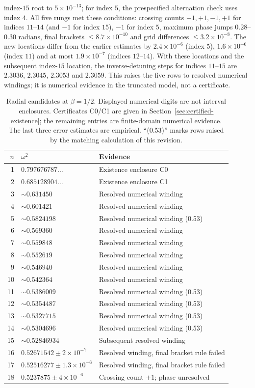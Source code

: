 index-$15$ root to $5\times10^{-13}$; for index $5$, the prespecified
alternation check uses index $4$. All five rungs met these conditions:
crossing counts $-1,+1,-1,+1$ for indices $11$--$14$ (and $-1$
for index $15$), $-1$ for index $5$, maximum phase jumps $0.28$--$0.30$
radians, final brackets $\le8.7\times10^{-10}$ and grid differences
$\le3.2\times10^{-8}$. The new locations differ from the earlier
estimates by $2.4\times10^{-6}$ (index $5$), $1.6\times10^{-6}$ (index
$11$) and at most $1.9\times10^{-7}$ (indices $12$--$14$). With these
locations and the subsequent index-$15$ location, the inverse-detuning
steps for indices $11$--$15$ are $2.3036$, $2.3045$, $2.3053$ and
$2.3059$. This raises the five rows to resolved numerical windings; it
is numerical evidence in the truncated model, not a certificate.

\begin{table}[htbp]\centering\small
\caption{Radial candidates at $\beta=1/2$. Displayed numerical digits
are not interval enclosures. Certificates C0/C1 are given in
Section~\ref{sec:certified-existence}; the remaining entries are finite-domain
numerical evidence. The last three error estimates are empirical.
``(0.53)'' marks rows raised by the matching calculation of this
revision.}
\label{tab:ladder}
\begin{tabular}{rll}\toprule
$n$&$\omega^2$&Evidence\\\midrule
1&$0.797676787\ldots$&Existence enclosure C0\\
2&$0.685128904\ldots$&Existence enclosure C1\\
3&$\sim0.631450$&Resolved numerical winding\\
4&$\sim0.601421$&Resolved numerical winding\\
5&$\sim0.5824198$&Resolved numerical winding (0.53)\\
6&$\sim0.569360$&Resolved numerical winding\\
7&$\sim0.559848$&Resolved numerical winding\\
8&$\sim0.552619$&Resolved numerical winding\\
9&$\sim0.546940$&Resolved numerical winding\\
10&$\sim0.542364$&Resolved numerical winding\\
11&$\sim0.5386009$&Resolved numerical winding (0.53)\\
12&$\sim0.5354487$&Resolved numerical winding (0.53)\\
13&$\sim0.5327715$&Resolved numerical winding (0.53)\\
14&$\sim0.5304696$&Resolved numerical winding (0.53)\\
15&$\sim0.52846934$&Subsequent resolved winding\\
16&$0.52671542\pm2\times10^{-7}$&Resolved winding, final bracket rule failed\\
17&$0.52516277\pm1.3\times10^{-6}$&Resolved winding, final bracket rule failed\\
18&$0.5237875\pm4\times10^{-6}$&Crossing count $+1$; phase unresolved\\\bottomrule
\end{tabular}
\end{table}

